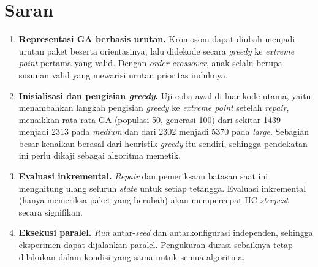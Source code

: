 \section{Saran}

\begin{enumerate}
	\item \textbf{Representasi GA berbasis urutan.} Kromosom dapat diubah menjadi urutan
	paket beserta orientasinya, lalu didekode secara \textit{greedy} ke \textit{extreme
	point} pertama yang valid. Dengan \textit{order crossover}, anak selalu berupa susunan
	valid yang mewarisi urutan prioritas induknya.
	\item \textbf{Inisialisasi dan pengisian \textit{greedy}.} Uji coba awal di luar kode
	utama, yaitu menambahkan langkah pengisian \textit{greedy} ke \textit{extreme point}
	setelah \textit{repair}, menaikkan rata-rata GA (populasi 50, generasi 100) dari
	sekitar 1439 menjadi 2313 pada \textit{medium} dan dari 2302 menjadi 5370 pada
	\textit{large}. Sebagian besar kenaikan berasal dari heuristik \textit{greedy} itu
	sendiri, sehingga pendekatan ini perlu dikaji sebagai algoritma memetik.
	\item \textbf{Evaluasi inkremental.} \textit{Repair} dan pemeriksaan batasan saat ini
	menghitung ulang seluruh \textit{state} untuk setiap tetangga. Evaluasi inkremental
	(hanya memeriksa paket yang berubah) akan mempercepat HC \textit{steepest} secara
	signifikan.
	\item \textbf{Eksekusi paralel.} \textit{Run} antar-\textit{seed} dan antarkonfigurasi
	independen, sehingga eksperimen dapat dijalankan paralel. Pengukuran durasi
	sebaiknya tetap dilakukan dalam kondisi yang sama untuk semua algoritma.
\end{enumerate}
